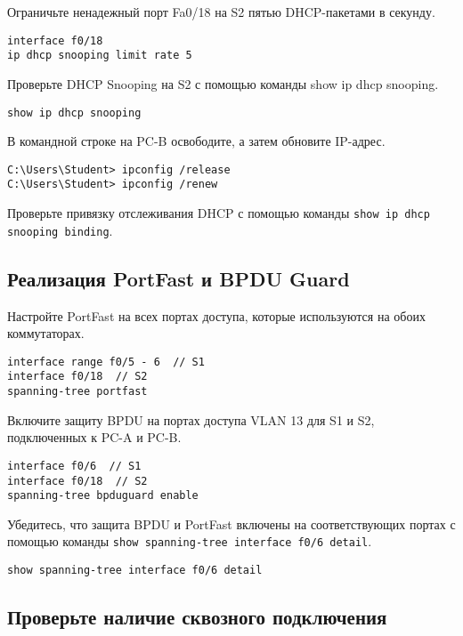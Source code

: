 Ограничьте ненадежный порт Fa0/18 на S2 пятью DHCP-пакетами в секунду.

\begin{verbatim}
interface f0/18
ip dhcp snooping limit rate 5
\end{verbatim}

Проверьте DHCP Snooping на S2 с помощью команды show ip dhcp snooping.

\begin{verbatim}
show ip dhcp snooping
\end{verbatim}


В командной строке на PC-B освободите, а затем обновите IP-адрес.

\begin{verbatim}
C:\Users\Student> ipconfig /release
C:\Users\Student> ipconfig /renew
\end{verbatim}


Проверьте привязку отслеживания DHCP
с помощью команды \texttt{show ip dhcp snooping binding}.



\subsection{Реализация PortFast и BPDU Guard}

Настройте PortFast на всех портах доступа,
которые используются на обоих коммутаторах.

\begin{verbatim}
interface range f0/5 - 6  // S1
interface f0/18  // S2
spanning-tree portfast
\end{verbatim}

Включите защиту BPDU на портах доступа VLAN 13 для S1 и S2,
подключенных к PC-A и PC-B.

\begin{verbatim}
interface f0/6  // S1
interface f0/18  // S2
spanning-tree bpduguard enable
\end{verbatim}

Убедитесь, что защита BPDU и PortFast включены на соответствующих портах
с помощью команды \texttt{show spanning-tree interface f0/6 detail}.

\begin{verbatim}
show spanning-tree interface f0/6 detail
\end{verbatim}

\subsection{Проверьте наличие сквозного подключения}

